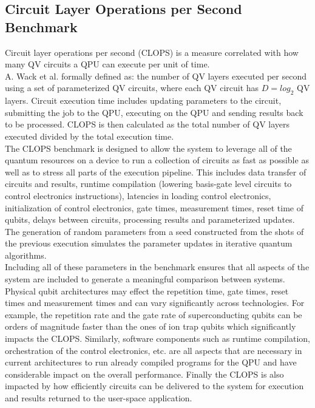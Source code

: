 \subsection{Circuit Layer Operations per Second Benchmark}
Circuit layer operations per second (CLOPS) is a measure correlated with how many QV circuits a QPU can execute per unit of time. \\
A. Wack et al. \cite{Wack2021Oct} formally defined as: the number of QV layers executed per second using a set of parameterized QV circuits, where each QV circuit has $D = log_2$ QV layers. Circuit execution time includes updating parameters to the circuit, submitting the job to the QPU, executing on the QPU and sending results back to be processed. CLOPS is then calculated as the total number of QV layers executed divided by the total execution time. \\
The CLOPS benchmark is designed to allow the system to leverage all of the quantum resources on a device to run a collection of circuits as fast as possible as well as to stress all parts of the execution pipeline. This includes data transfer of circuits and results, runtime compilation (lowering basis-gate level circuits to control electronics instructions), latencies in loading control electronics, initialization of control electronics, gate times, measurement times, reset time of qubits, delays between circuits, processing results and parameterized updates. The generation of random parameters from a seed constructed from the shots of the previous execution simulates the parameter updates in iterative quantum algorithms. \\
Including all of these parameters in the benchmark ensures that all aspects of the system are included to generate a meaningful comparison between systems. Physical qubit architectures may effect the repetition time, gate times, reset times and measurement times and can vary significantly across technologies. For example, the repetition rate and the gate rate of superconducting qubits can be orders of magnitude faster than the ones of ion trap qubits which significantly impacts the CLOPS. Similarly, software components such as runtime compilation, orchestration of the control electronics, etc. are all aspects that are necessary in current architectures to run already compiled programs for the QPU and have considerable impact on the overall performance. Finally the CLOPS is also impacted by how efficiently circuits can be delivered to the system for execution and results returned to the user-space application.

